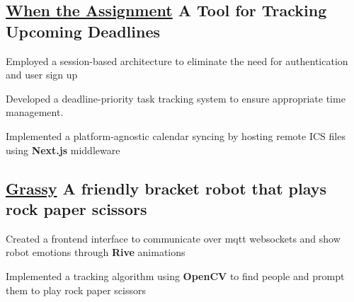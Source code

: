 \subsection{\href{https://mcwta.vercel.app/}{When the Assignment} \textbar{} A Tool for Tracking Upcoming Deadlines}
\begin{zitemize}
    \item Employed a session-based architecture to eliminate the need for authentication and user sign up
    \item Developed a deadline-priority task tracking system to ensure appropriate time management.
    \item Implemented a platform-agnostic calendar syncing by hosting remote ICS files using \textbf{Next.js} middleware
\end{zitemize}



\vspace{0.3cm}\subsection{\href{https://github.com/arian81/bracket-bot-controller}{Grassy} \textbar{} A friendly bracket robot that plays rock paper scissors }
\begin{zitemize}
    \item Created a frontend interface to communicate over mqtt websockets and show robot emotions through \textbf{Rive} animations
    \item Implemented a tracking algorithm using \textbf{OpenCV} to find people and prompt them to play rock paper scissors
\end{zitemize}



